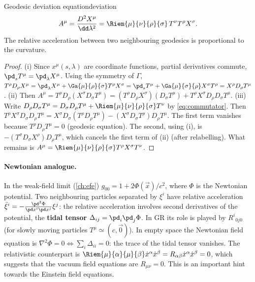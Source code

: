 \begin{theorem}{Geodesic deviation equation}{deviation}
\begin{equation}
  A^\mu=\frac{D^2X^\mu}{\dd\lambda^2}=\Riem{\mu}{\nu}{\rho}{\sigma}\,T^\nu T^\rho X^\sigma .
\end{equation}
The relative acceleration between two neighbouring geodesics is proportional to the curvature.
\end{theorem}
\begin{proof}
(i) Since $x^\mu(s,\lambda)$ are coordinate functions, partial derivatives commute, $\pd_s T^\mu=\pd_\lambda X^\mu$. Using the symmetry of $\Gamma$,
$T^\rho D_\rho X^\mu=\pd_\lambda X^\mu+\Ga{\mu}{\rho}{\sigma}T^\rho X^\sigma=\pd_sT^\mu+\Ga{\mu}{\sigma}{\rho}X^\sigma T^\rho=X^\rho D_\rho T^\mu$.
(ii) Then $A^\mu=T^\rho D_\rho(X^\sigma D_\sigma T^\mu)=(T^\rho D_\rho X^\sigma)(D_\sigma T^\mu)+T^\rho X^\sigma D_\rho D_\sigma T^\mu$.
(iii) Write $D_\rho D_\sigma T^\mu=D_\sigma D_\rho T^\mu+\Riem{\mu}{\nu}{\rho}{\sigma}T^\nu$ by \eqref{eq:commutator}. Then
$T^\rho X^\sigma D_\sigma D_\rho T^\mu=X^\sigma D_\sigma(T^\rho D_\rho T^\mu)-(X^\sigma D_\sigma T^\rho)D_\rho T^\mu$. The first term vanishes because $T^\rho D_\rho T^\mu=0$ (geodesic equation). The second, using (i), is $-(T^\sigma D_\sigma X^\rho)D_\rho T^\mu$, which cancels the first term of (ii) (after relabelling). What remains is $A^\mu=\Riem{\mu}{\nu}{\rho}{\sigma}T^\rho X^\sigma T^\nu$.
\end{proof}

\paragraph{Newtonian analogue.} In the weak-field limit (\cref{ch:efe}) $g_{00}=1+2\Phi(\vec x)/c^2$, where $\Phi$ is the Newtonian potential. Two neighbouring particles separated by $\xi^i$ have relative acceleration $\ddot\xi^i=-\frac{\pd^2\Phi}{\pd x^i\pd x^j}\xi^j$: the relative acceleration involves second derivatives of the potential, the \textbf{tidal tensor} $\Delta_{ij}=\pd_i\pd_j\Phi$. In GR its role is played by $R^i{}_{0j0}$ (for slowly moving particles $T^\mu\simeq(c,\vec 0)$). In empty space the Newtonian field equation is $\nabla^2\Phi=0\Leftrightarrow\sum_i\Delta_{ii}=0$: the trace of the tidal tensor vanishes. The relativistic counterpart is $\Riem{\mu}{\alpha}{\mu}{\beta}\dot x^\alpha\dot x^\beta=R_{\alpha\beta}\dot x^\alpha\dot x^\beta=0$, which suggests that the vacuum field equations are $R_{\mu\nu}=0$. This is an important hint towards the Einstein field equations.
